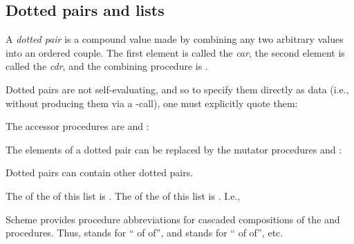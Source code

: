 {\subsection{Dotted pairs and lists}

A {\em dotted pair} is a compound value made by combining
any two arbitrary values into an ordered couple.  The
first element is called the {\em car}, the second
element is called the {\em cdr}, and the combining
procedure is .


\n Dotted pairs are not self-evaluating, and so to specify
them directly as data (i.e., without producing them via
a -call), one must explicitly quote them:


\n The accessor procedures are  and :



\n The elements of a dotted pair can be replaced by the
mutator procedures  and :


\n Dotted pairs can contain other dotted pairs.


\n The  of the  of this list is .
The  of the  of this list is .
I.e.,



\n Scheme provides procedure abbreviations for cascaded
compositions of the  and  procedures.
Thus,  stands for “ of  of”,
and  stands for “ of  of”, etc.


}
